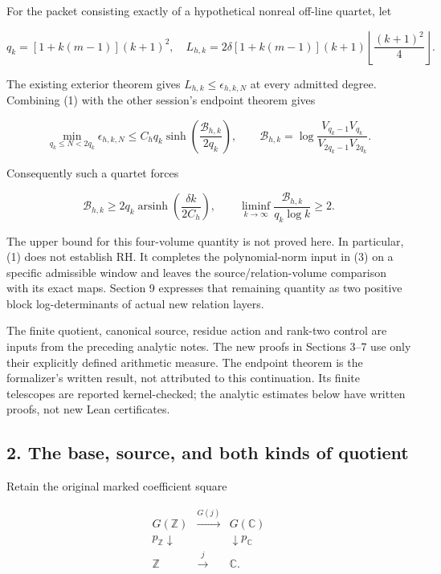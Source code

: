 For the packet consisting exactly of a hypothetical nonreal off-line quartet, let

\[
 q_k=[1+k(m-1)](k+1)^2,
 \quad
 L_{h,k}=2\delta[1+k(m-1)](k+1)
                 \left\lfloor\frac{(k+1)^2}{4}\right\rfloor.             \tag{2}
\]

The existing exterior theorem gives \(L_{h,k}\le\epsilon_{h,k,N}\) at every admitted degree. Combining (1) with the other session's endpoint theorem gives

\[
 \boxed{\min_{q_k\le N<2q_k}\epsilon_{h,k,N}
 \le C_hq_k\sinh\!\left(\frac{\mathcal B_{h,k}}{2q_k}\right),\qquad
 \mathcal B_{h,k}=\log\frac{V_{q_k-1}V_{q_k}}
                              {V_{2q_k-1}V_{2q_k}}.}                    \tag{3}
\]

Consequently such a quartet forces

\[
 \boxed{\mathcal B_{h,k}\ge
 2q_k\operatorname{arsinh}\!\left(\frac{\delta k}{2C_h}\right),\qquad
 \liminf_{k\to\infty}\frac{\mathcal B_{h,k}}{q_k\log k}\ge2.}           \tag{4}
\]

The upper bound for this four-volume quantity is not proved here. In particular, (1) does not establish RH. It completes the polynomial-norm input in (3) on a specific admissible window and leaves the source/relation-volume comparison with its exact maps. Section 9 expresses that remaining quantity as two positive block log-determinants of actual new relation layers.

The finite quotient, canonical source, residue action and rank-two control are inputs from the preceding analytic notes. The new proofs in Sections 3--7 use only their explicitly defined arithmetic measure. The endpoint theorem is the formalizer's written result, not attributed to this continuation. Its finite telescopes are reported kernel-checked; the analytic estimates below have written proofs, not new Lean certificates.

\subsection{2. The base, source, and both kinds of quotient}\label{zlm:endpoint-arithmetic_original--the-base-source-and-both-kinds-of-quotient}

Retain the original marked coefficient square

\[
\begin{array}{ccc}
 G(\mathbb Z)&\xrightarrow{G(j)}&G(\mathbb C)\\
 p_{\mathbb Z}\downarrow&&\downarrow p_{\mathbb C}\\
 \mathbb Z&\xrightarrow{j}&\mathbb C.
\end{array}                                                          \tag{5}
\]

